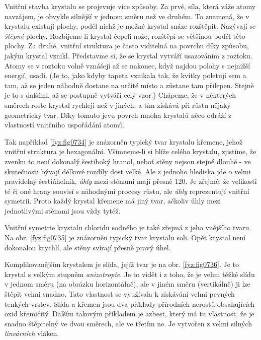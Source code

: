     Vnitřní stavba krystalu se projevuje více způsoby. Za prvé, síla, která váže atomy navzájem, je 
    obvykle silnější v jednom směru než ve druhém. To znamená, že v krystalu existují plochy, podél 
    nichž je možné krystal snáze rozštěpit. Nazývají se \emph{štěpné} plochy. Rozbijeme-li krystal 
    čepelí nože, rozštěpí se většinou podél této plochy. Za druhé, vnitřní struktura je často 
    viditelná na povrchu díky způsobu, jakým krystal vznikl. Představme si, že se krystal vytváří 
    usazováním z roztoku. Atomy se v roztoku volně vznášejí až se nakonec, když najdou polohy s 
    nejnižší energií, usadí. (Je to, jako kdyby tapeta vznikala tak, že kvítky poletují sem a tam, 
    až se jeden náhodně dostane na určité místo a zůstane tam přilepen. Stejně je to s dalšími, až 
    se postupně vytváří celý vzor.) Chápeme, že v některých směrech roste krystal rychleji než v 
    jiných, a tím získává při růstu nějaký geometrický tvar. Díky tomuto jevu povrch mnoha krystalů 
    něco odráží z vlastností vnitřního uspořádání atomů,
    
    Tak například \ref{fyz:fig0734} je znázorněn typický tvar krystalu křemene, jehož vnitřní 
    struktura je hexagonální. Všimneme-li si blíže celého krystalu, zjistíme, že zvenku to není 
    dokonalý šestiboký hranol, neboť stěny nejsou stejné dlouhé - ve skutečnosti bývají délkové 
    rozdíly dost velké. Ale z jednoho hlediska jde o velmi pravidelný šestiúhelník, \emph{úhly} 
    mezi stěnami mají přesně \qty{120}{\deg}. Je zřejmé, že velikosti té či oné hrany souvisí s 
    náhodnými procesy růstu, ale \emph{úhly} reprezentují vnitřní symetrii. Proto každý krystal 
    křemene má jiný tvar, ačkoliv úhly mezi jednotlivými stěnami jsou vždy tytéž. 
    
    Vnitřní symetrie krystalu chloridu sodného je také zřejmá z jeho vnějšího tvaru. Na obr. 
    \ref{fyz:fig0735} je znázorněn typický tvar krystalu soli. Opět krystal není dokonalou krychlí, 
    ale stěny svírají přesně pravý úhel. 
    
    Komplikovanějším krystalem je slída, jejíž tvar je na obr. \ref{fyz:fig0736}. Je to krystal s 
    velkým stupněm \emph{anizotropie}. Je to vidět i z toho, že je velmi těžké slídu v jednom směru 
    (na obrázku horizontálně), ale v jiném směru (vertikálně) ji lze štěpit velmi snadno. Tato 
    vlastnost se využívala k získávání velmi pevných tenkých vrstev. Slída a křemen jsou dva 
    příklady přírodních nerostů obsahujících oxid křemičitý. Dalším takovým příkladem je azbest, 
    který má tu vlastnost, že je snadno štěpitelný ve dvou směrech, ale ve třetím ne. Je vytvořen z 
    velmi silných \emph{lineárních} vláken. 
    
